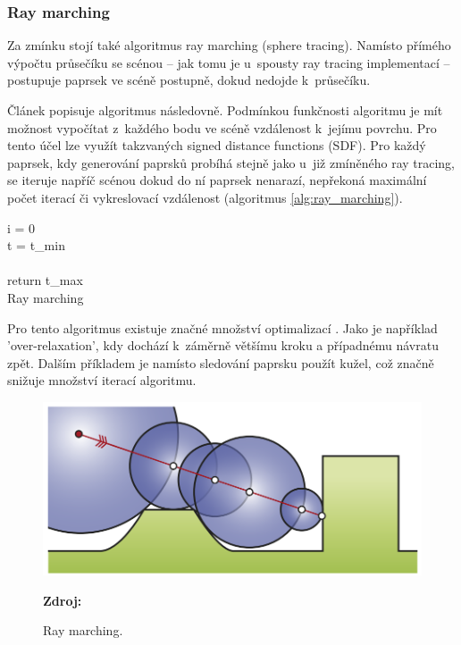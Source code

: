 \subsubsection{Ray marching}
Za zmínku stojí také algoritmus ray marching (sphere tracing). Namísto přímého výpočtu průsečíku se scénou -- jak tomu je u~spousty ray tracing implementací -- postupuje paprsek ve scéně postupně, dokud nedojde k~průsečíku.

Článek \cite{sphere_tracing} popisuje algoritmus následovně. Podmínkou funkčnosti algoritmu je mít možnost vypočítat z~každého bodu ve scéně vzdálenost k~jejímu povrchu. Pro tento účel lze využít takzvaných signed distance functions (SDF). Pro každý paprsek, kdy generování paprsků probíhá stejně jako u~již zmíněného ray tracing, se iteruje napříč scénou dokud do ní paprsek nenarazí, nepřekoná maximální počet iterací či vykreslovací vzdálenost (algoritmus \ref{alg:ray_marching}).


\begin{center}
	\begin{czechalgorithm}[H] \label{alg:ray_marching}
		i = 0\\
		t = t\_min\\
		\\
		return t\_max\\
		\caption{Ray marching}
	\end{czechalgorithm}
\end{center}

Pro tento algoritmus existuje značné množství optimalizací \cite{Keinert2014EnhancedST}. Jako je například 'over-relaxation', kdy dochází k~záměrně většímu kroku a případnému návratu zpět. Dalším příkladem je namísto sledování paprsku použít kužel, což značně snižuje množství iterací algoritmu.

\begin{figure}[H]
	\centering
	\includegraphics[scale=0.8]{obrazky-figures/ray_marching.png}
	\caption{Ray marching.}
	\textbf{Zdroj: \cite{Keinert2014EnhancedST}}
	\label{fig:ray_marching}
\end{figure}



